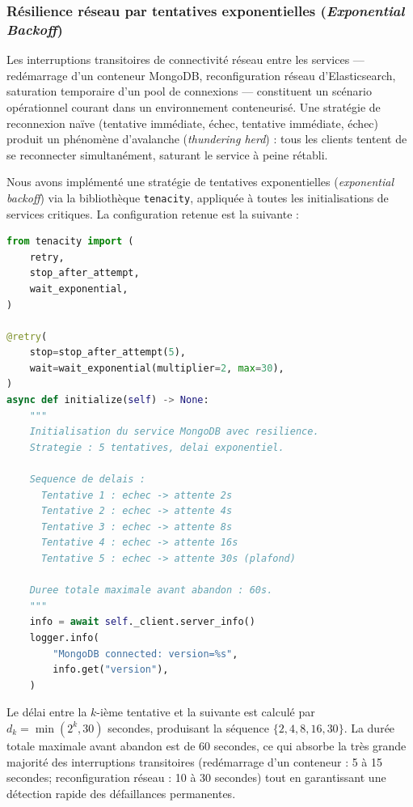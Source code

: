 \subsubsection{Résilience réseau par tentatives exponentielles (\textit{Exponential Backoff})}

Les interruptions transitoires de connectivité réseau entre les services --- redémarrage d'un conteneur MongoDB, reconfiguration réseau d'Elasticsearch, saturation temporaire d'un pool de connexions --- constituent un scénario opérationnel courant dans un environnement conteneurisé. Une stratégie de reconnexion naïve (tentative immédiate, échec, tentative immédiate, échec) produit un phénomène d'avalanche (\textit{thundering herd}) : tous les clients tentent de se reconnecter simultanément, saturant le service à peine rétabli.

Nous avons implémenté une stratégie de tentatives exponentielles (\textit{exponential backoff}) via la bibliothèque \texttt{tenacity}, appliquée à toutes les initialisations de services critiques. La configuration retenue est la suivante :

\begin{lstlisting}[language=Python, caption={Résilience réseau par tentatives exponentielles via \texttt{tenacity}.}, label={lst:backoff}]
from tenacity import (
    retry,
    stop_after_attempt,
    wait_exponential,
)

@retry(
    stop=stop_after_attempt(5),
    wait=wait_exponential(multiplier=2, max=30),
)
async def initialize(self) -> None:
    """
    Initialisation du service MongoDB avec resilience.
    Strategie : 5 tentatives, delai exponentiel.

    Sequence de delais :
      Tentative 1 : echec -> attente 2s
      Tentative 2 : echec -> attente 4s
      Tentative 3 : echec -> attente 8s
      Tentative 4 : echec -> attente 16s
      Tentative 5 : echec -> attente 30s (plafond)

    Duree totale maximale avant abandon : 60s.
    """
    info = await self._client.server_info()
    logger.info(
        "MongoDB connected: version=%s",
        info.get("version"),
    )
\end{lstlisting}

Le délai entre la $k$-ième tentative et la suivante est calculé par $d_k = \min(2^k, 30)$ secondes, produisant la séquence $\{2, 4, 8, 16, 30\}$. La durée totale maximale avant abandon est de 60 secondes, ce qui absorbe la très grande majorité des interruptions transitoires (redémarrage d'un conteneur : 5 à 15 secondes; reconfiguration réseau : 10 à 30 secondes) tout en garantissant une détection rapide des défaillances permanentes.

